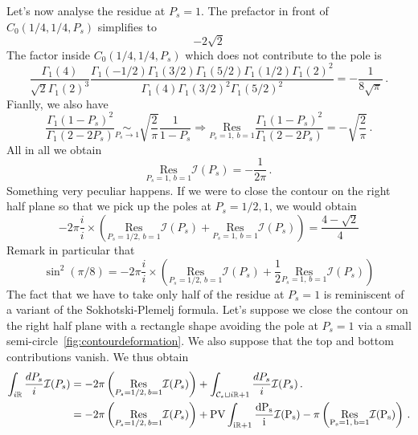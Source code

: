 \documentclass[11pt]{article}
\begin{document}
Let's now analyse the residue at $P_s =1$. The prefactor in front of $C_0(1/4,1/4,P_s)$ simplifies to
\[
-2\sqrt{2}
\]
The factor inside $C_0(1/4,1/4,P_s)$ which does not contribute to the pole is
\begin{equation}
        \frac{\Gamma_1(4)}{\sqrt{2}\Gamma_1(2)^3}\frac{\Gamma_1(-1/2) \Gamma_1(3/2)\Gamma_1(5/2) \Gamma_1(1/2)\Gamma_1(2)^{2}}{\Gamma_1(4)\Gamma_1(3/2)^2 \Gamma_1(5/2)^2}=-\frac{1}{8\sqrt{\pi}}\,.
\end{equation} 
Fianlly, we also have 
\begin{equation}
    \frac{\Gamma_1(1-P_s)^2}{\Gamma_1(2-2P_s)} \underset{P_s \to 1}{\sim} \sqrt{\frac{2}{\pi}}\frac{1}{1-P_s}\Rightarrow \underset{P_s=1,\,b=1}{\mathrm{Res}} \frac{\Gamma_1(1-P_s)^2}{\Gamma_1(2-2P_s)} = -\sqrt{\frac{2}{\pi}}\,.
\end{equation}
All in all we obtain
\begin{equation}
    \underset{P_s=1,\,b=1}{\mathrm{Res}}\mathcal{I}(P_s) = -\frac{1}{2\pi}\,.
\end{equation}
Something very peculiar happens. If we were to close the contour on the right half plane so that we pick up the poles at $P_s=1/2,1$, we would obtain
\begin{equation}
    -2\pi \frac{i}{i} \times \left(\underset{P_s=1/2,\,b=1}{\mathrm{Res}}\mathcal{I}(P_s)+\underset{P_s=1,\,b=1}{\mathrm{Res}}\mathcal{I}(P_s) \right) = \frac{4-\sqrt{2}}{4}
\end{equation}
Remark in particular that
\begin{equation}
    \sin^2(\pi/8) = -2\pi \frac{i}{i} \times \left(\underset{P_s=1/2,\,b=1}{\mathrm{Res}}\mathcal{I}(P_s)+\frac{1}{2}\underset{P_s=1,\,b=1}{\mathrm{Res}}\mathcal{I}(P_s) \right)
\end{equation}
The fact that we have to take only half of the residue at $P_s=1$ is reminiscent of a variant of the Sokhotski-Plemelj formula. Let's suppose we close the contour on the right half plane with a rectangle shape avoiding the pole at $P_s=1$ via a small semi-circle~\ref{fig:contourdeformation}. We also suppose that the top and bottom contributions vanish. We thus obtain
\begin{equation}
\begin{aligned}
        \int_{i\mathbb{R}} \frac{dP_s}{i} \mathcal{I}(P_s) &= -2\pi \left(\underset{P_s=1/2,\,b=1}{\mathrm{Res}}\mathcal{I}(P_s)\right) + \int_{\mathcal{C}_\epsilon \sqcup i\mathbb{R}+1} \frac{dP_s}{i} \mathcal{I}(P_s)\,.\\
        &= -2\pi \left(\underset{P_s=1/2,\,b=1}{\mathrm{Res}}\mathcal{I}(P_s)\right) + \rm{PV} \int_{i\mathbb{R}+1} \frac{dP_s}{i} \mathcal{I}(P_s) - \pi \left(\underset{P_s=1,\,b=1}{\mathrm{Res}}\mathcal{I}(P_s)\right)\,.
\end{aligned}
\end{equation}
\end{document}
